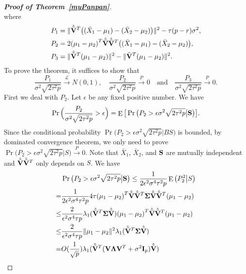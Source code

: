 \documentclass[review]{elsarticle}
\DeclareMathOperator{\myE}{E}
\theoremstyle{plain}
\theoremstyle{definition}
\theoremstyle{remark}
\begin{document}
\begin{appendices}
\begin{proof}[\textbf{Proof of Theorem~\ref{myPanpan}}]
\begin{equation*}
\end{equation*}
where
\begin{align*}
    P_1&=\|\hat{\tilde{\mathbf{V}}}^T\big((\bar{X}_1-\mu_1)-(\bar{X}_2-\mu_2)\big)\|^2- \tau (p-r)\sigma^2,\\
    P_2&=2{(\mu_1-\mu_2)}^T \hat{\tilde{\mathbf{V}}}\hat{\tilde{\mathbf{V}}}^T\big((\bar{X}_1-\mu_1)-(\bar{X}_2-\mu_2)\big),\\
    P_3&=\|\hat{\tilde{\mathbf{V}}}^T(\mu_1-\mu_2)\|^2-\|\tilde{\mathbf{V}}^T(\mu_1-\mu_2)\|^2.
\end{align*}
To prove the theorem, it suffices to show that
$$
    \frac{P_1}{\sigma^2\sqrt{2\tau^2 p}}\xrightarrow{\mathcal{L}} N(0,1),
    \quad
    \frac{P_2}{\sigma^2\sqrt{2\tau^2 p}}\xrightarrow{P} 0
    \quad
    \textrm{and}
    \quad
    \frac{P_3}{\sigma^2\sqrt{2\tau^2 p}}\xrightarrow{P}0.
    $$
   First we deal with $P_2$.
   Let $\epsilon$ be any fixed positive number. 
   We have
   $$
   \Pr\Big(\frac{P_2}{\sigma^2\sqrt{2\tau^2 p}}>\epsilon\Big)
   =
   \myE\big[\Pr\big({P_2}>\epsilon{\sigma^2\sqrt{2\tau^2 p}}\big|\BS\big)\big].
   $$
   Since the conditional probability 
   $
   \Pr\big({P_2}>\epsilon{\sigma^2\sqrt{2\tau^2 p}}\big|BS\big)
   $
   is bounded, by dominated convergence theorem, we only need to prove
   $\Pr\big({P_2}>\epsilon{\sigma^2\sqrt{2\tau^2 p}}\big|S\big)\xrightarrow{P}0$.
    Note that $\bar{X}_1$, $\bar{X}_2$, and $\mathbf{S}$ are mutually independent and $\hat{\tilde{\mathbf{V}}}\hat{\tilde{\mathbf{V}}}^T$ only depends on $S$.
    We have
    \begin{equation*}
        \begin{aligned}
            &\Pr\big({P_2}>\epsilon{\sigma^2\sqrt{2\tau^2 p}}\big|\BS\big)\leq
            \frac{1}{2\epsilon^2\sigma^4\tau^2 p}\myE \big(P_2^2\big|S\big)\\
            =&\frac{1}{2\epsilon^2\sigma^4\tau^2 p} 4\tau {(\mu_1-\mu_2)}^T \hat{\tilde{\BV}}\hat{\tilde{\BV}}^T\bSigma \hat{\tilde{\BV}}\hat{\tilde{\BV}}^T(\mu_1-\mu_2)\\
            \leq &
            \frac{2}{\epsilon^2\sigma^4\tau p}
             \lambda_1(\hat{\tilde{\BV}}^T\bSigma \hat{\tilde{\BV}}) {(\mu_1-\mu_2)}^T \hat{\tilde{\BV}}\hat{\tilde{\BV}}^T(\mu_1-\mu_2)\\
            \leq & 
\frac{2}{\epsilon^2\sigma^4\tau p}
             \|\mu_1-\mu_2\|^2
             \lambda_1(\hat{\tilde{\BV}}^T\bSigma \hat{\tilde{\BV}})\\
             =&
             O(\frac{1}{\sqrt{p}})
             \lambda_1(\hat{\tilde{\BV}}^T (\BV\bLambda \BV^T +\sigma^2 \BI_p) \hat{\tilde{\BV}})\\

\end{aligned}
\end{equation*}
\end{proof}
\end{appendices}
\end{document}
